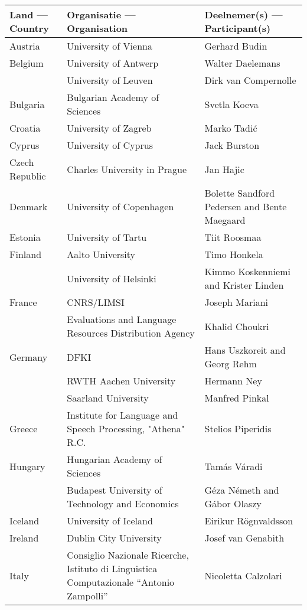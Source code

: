 \documentclass{scrartcl}
\begin{document}
\begin{Parallel}[c]{70mm}{70mm}
  \begin{tabular*}{\textwidth}{l|p{6cm}|p{4cm}}
    \hline \textbf{Land --- Country} & \textbf{Organisatie --- Organisation} & \textbf{Deelnemer(s) --- Participant(s)} \\
    \hline Austria & University of Vienna & Gerhard Budin\\
    \hline Belgium & University of Antwerp & Walter Daelemans\\
    \hline          & University of Leuven & Dirk van Compernolle  \\
    \hline Bulgaria & Bulgarian Academy of Sciences & Svetla Koeva \\
    \hline Croatia & University of Zagreb & Marko Tadi{\'c}\\
    \hline Cyprus & University of Cyprus & Jack Burston\\
    \hline Czech Republic & Charles University in Prague & Jan Hajic \\
    \hline Denmark & University of Copenhagen & Bolette Sandford Pedersen and
    Bente Maegaard\\
    \hline Estonia & University of Tartu & Tiit Roosmaa\\
    \hline Finland & Aalto University & Timo Honkela\\
    \hline  & University of Helsinki & Kimmo Koskenniemi and
    Krister Linden \\
    \hline France & CNRS/LIMSI & Joseph Mariani \\
    \hline & Evaluations and Language Resources Distribution Agency & Khalid Choukri\\
    \hline Germany & DFKI & Hans Uszkoreit and Georg Rehm\\
    \hline & RWTH Aachen University & Hermann Ney\\
    \hline & Saarland University & Manfred Pinkal\\
    \hline Greece & Institute for Language and Speech Processing, "Athena" R.C. & Stelios Piperidis\\
    \hline Hungary & Hungarian Academy of Sciences & Tam{\'a}s V{\'a}radi\\
    \hline & Budapest University of Technology and Economics & G{\'e}za N{\'e}meth and G{\'a}bor Olaszy\\
    \hline Iceland & University of Iceland & Eirikur R{\"o}gnvaldsson\\
    \hline Ireland & Dublin City University & Josef van Genabith\\
    \hline Italy & Consiglio Nazionale Ricerche,  Istituto di Linguistica Computazionale “Antonio Zampolli” & Nicoletta Calzolari\\

\end{tabular*}
\end{Parallel}
\end{document}
